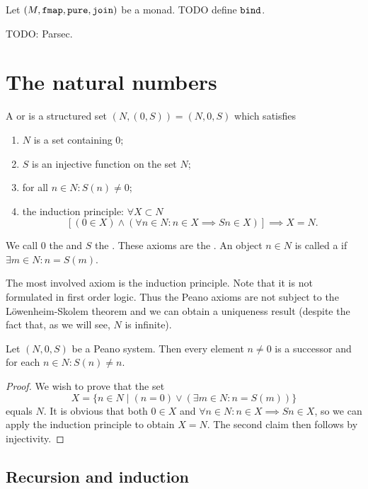 \begin{definition}
Let $\sSet{M, \fmap, \pure, \join}$ be a monad. TODO define $\mathtt{bind}$.
\end{definition}


TODO: Parsec.


\chapter{The natural numbers}
\begin{definition}
A  or  is a structured set $(N,(0,S)) = (N,0,S)$ which satisfies
\begin{enumerate}
\item $N$ is a set containing $0$;
\item $S$ is an injective function on the set $N$;
\item for all $n\in N: S(n) \neq 0$;
\item the induction principle: $\forall X\subset N$
\[ [(0\in X) \land (\forall n\in N: n\in X \implies Sn \in X)] \implies X = N. \]
\end{enumerate}
We call $0$ the  and $S$ the . These axioms are the . An object $n\in N$ is called a  if $\exists m\in N: n = S(m)$.
\end{definition}
The most involved axiom is the induction principle. Note that it is not formulated in first order logic. Thus the Peano axioms are not subject to the Löwenheim-Skolem theorem and we can obtain a uniqueness result (despite the fact that, as we will see, $N$ is infinite).

\begin{lemma} \label{successor}
Let $(N,0,S)$ be a Peano system. Then every element $n\neq 0$ is a successor and for each $n\in N: S(n) \neq n$.
\end{lemma}
\begin{proof}
We wish to prove that the set
\[ X = \{n\in N\;|\; (n=0)\lor(\exists m\in N: n = S(m))\} \]
equals $N$. It is obvious that both $0\in X$ and $\forall n\in N: n\in X \implies Sn \in X$, so we can apply the induction principle to obtain $X=N$. The second claim then follows by injectivity.
\end{proof}
\section{Recursion and induction}
